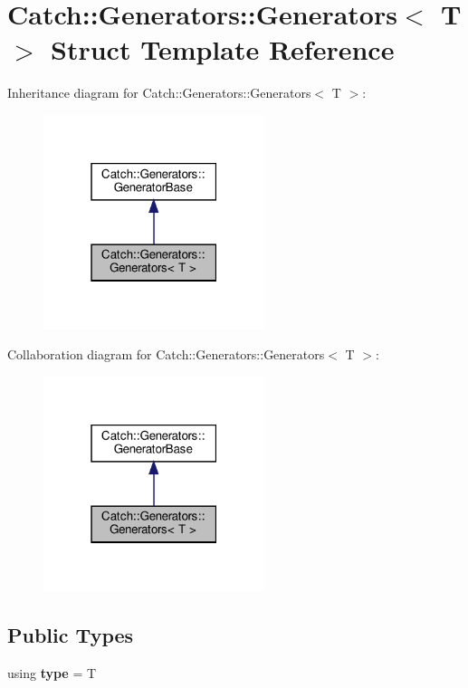 \hypertarget{structCatch_1_1Generators_1_1Generators}{}\section{Catch\+::Generators\+::Generators$<$ T $>$ Struct Template Reference}
\label{structCatch_1_1Generators_1_1Generators}


Inheritance diagram for Catch\+::Generators\+::Generators$<$ T $>$\+:
\nopagebreak
\begin{figure}[H]
\begin{center}
\leavevmode
\includegraphics[width=183pt]{structCatch_1_1Generators_1_1Generators__inherit__graph}
\end{center}
\end{figure}


Collaboration diagram for Catch\+::Generators\+::Generators$<$ T $>$\+:
\nopagebreak
\begin{figure}[H]
\begin{center}
\leavevmode
\includegraphics[width=183pt]{structCatch_1_1Generators_1_1Generators__coll__graph}
\end{center}
\end{figure}
\subsection*{Public Types}
\begin{DoxyCompactItemize}
\item 
\mbox{\label{structCatch_1_1Generators_1_1Generators_aab27f98a577b49532b2ca7556a84286b}} 
using {\bfseries type} = T
\end{DoxyCompactItemize}
